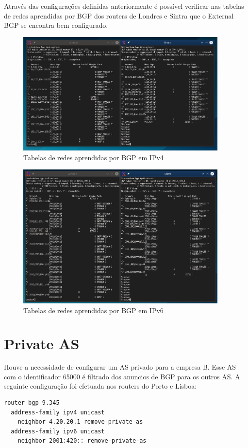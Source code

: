 \documentclass[11pt,a4paper]{report}
\begin{document}
Através das configurações definidas anteriormente é possível verificar nas tabelas de redes aprendidas por BGP dos routers de Londres e Sintra que o External BGP se encontra bem configurado.

\begin{figure}[H]
\centerline{\includegraphics[width=300pt]{private_as_removal_ipv4.png}}
\caption{Tabelas de redes aprendidas por BGP em IPv4}
\label{schema}
\end{figure}

\begin{figure}[H]
\centerline{\includegraphics[width=300pt]{private_as_removal_ipv6.png}}
\caption{Tabelas de redes aprendidas por BGP em IPv6}
\label{schema}
\end{figure}

\section{Private AS}
Houve a necessidade de configurar um AS privado para a empresa B. Esse AS com o identificador 65000 é filtrado dos anuncios de BGP para os outros AS. A seguinte configuração foi efetuada nos routers do Porto e Lisboa:

\begin{lstlisting}[caption=Remoção do AS privado - Router Porto]
router bgp 9.345
  address-family ipv4 unicast
    neighbor 4.20.20.1 remove-private-as
  address-family ipv6 unicast
  	neighbor 2001:420:: remove-private-as
\end{lstlisting}
\end{document}
